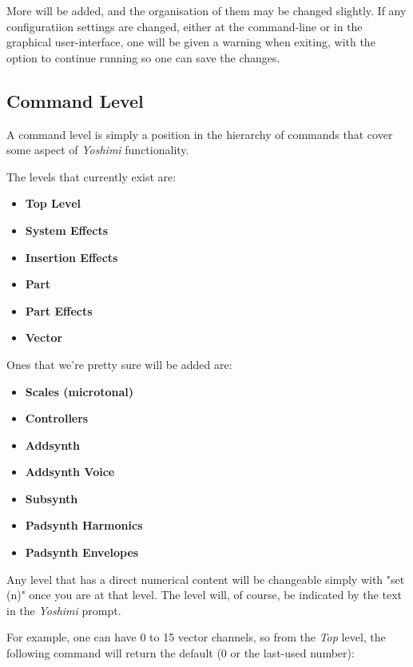    More will be added, and the organisation of them may be changed slightly.
   If any configuratiion settings are changed, either at the command-line
   or in the graphical user-interface, one will be given a warning when
   exiting, with the option to continue running so one can save the changes.

\subsection{Command Level}
\label{subsec:command_line_command_level}

   A command level is simply a position in the hierarchy of commands that cover
   some aspect of \textsl{Yoshimi} functionality.

   The levels that currently exist are:

   \begin{itemize}
      \item \textbf{Top Level}
      \item \textbf{System Effects}
      \item \textbf{Insertion Effects}
      \item \textbf{Part}
      \item \textbf{Part Effects}
      \item \textbf{Vector}
   \end{itemize}

Ones that we're pretty sure will be added are:

   \begin{itemize}
      \item \textbf{Scales (microtonal)}
      \item \textbf{Controllers}
      \item \textbf{Addsynth}
      \item \textbf{Addsynth Voice}
      \item \textbf{Subsynth}
      \item \textbf{Padsynth Harmonics}
      \item \textbf{Padsynth Envelopes}
   \end{itemize}

   Any level that has a direct numerical content will be changeable simply with
   "set (n)" once you are at that level.  The level will, of course, be
   indicated by the text in the \textsl{Yoshimi} prompt.

   For example, one can have 0 to 15 vector channels, so from the
   \textsl{Top} level, the following command
   will return the default  (0 or the last-used number):

